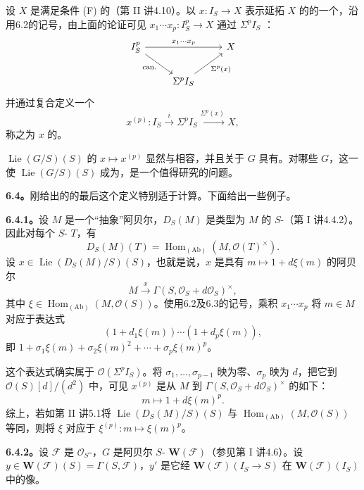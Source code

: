 设 $X$ 是满足条件 (F) 的（第 II 讲4.10）。以 $x:I_S\to X$ 表示延拓 $X$ 的的一个，沿用6.2的记号，由上面的论证可见 $x_1\cdots x_p:I_S^p\to X$ 通过 $\Sigma^pI_S$ ：
\[
\begin{tikzcd}
 I_S^p\arrow[rr,"x_1\cdots x_p"]\arrow[dr,"\mathrm{can.}"']&&X\\
 &\Sigma^pI_S\arrow[ur,"\Sigma^p(x)"']
\end{tikzcd}
\]
并通过复合定义一个
\[
 x^{(p)}:I_S\xrightarrow{i}\Sigma^pI_S\xrightarrow{\Sigma^p(x)}X,
\]
称之为 $x$ 的。

$\operatorname{Lie}(G/S)(S)$ 的 $x\mapsto x^{(p)}$ 显然与相容，并且关于 $G$ 具有。对哪些 $G$，这一使 $\operatorname{Lie}(G/S)(S)$ 成为，是一个值得研究的问题。

\textbf{6.4。}刚给出的的最后这个定义特别适于计算。下面给出一些例子。

\textbf{6.4.1。}设 $M$ 是一个“抽象”阿贝尔，$D_S(M)$ 是类型为 $M$ 的 $S$-（第 I 讲4.4.2）。因此对每个 $S$- $T$，有
\[
 D_S(M)(T)=\operatorname{Hom}_{(\mathrm{Ab})}(M,\mathcal O(T)^\times).
\]
设 $x\in\operatorname{Lie}(D_S(M)/S)(S)$，也就是说，$x$ 是具有 $m\mapsto1+d\xi(m)$ 的阿贝尔
\[
 M\xrightarrow{x}\Gamma(S,\mathcal O_S+d\mathcal O_S)^\times,
\]
其中 $\xi\in\operatorname{Hom}_{(\mathrm{Ab})}(M,\mathcal O(S))$。使用6.2及6.3的记号，乘积 $x_1\cdots x_p$ 将 $m\in M$ 对应于表达式
\[
 (1+d_1\xi(m))\cdots(1+d_p\xi(m)),
\]
即 $1+\sigma_1\xi(m)+\sigma_2\xi(m)^2+\cdots+\sigma_p\xi(m)^p$。

这个表达式确实属于 $\mathcal O(\Sigma^pI_S)$。将 $\sigma_1,\ldots,\sigma_{p-1}$ 映为零、$\sigma_p$ 映为 $d$，把它到 $\mathcal O(S)[d]/(d^2)$ 中，可见 $x^{(p)}$ 是从 $M$ 到 $\Gamma(S,\mathcal O_S+d\mathcal O_S)^\times$ 的如下：
\[
 m\longmapsto1+d\xi(m)^p.
\]
综上，若如第 II 讲5.1将 $\operatorname{Lie}(D_S(M)/S)(S)$ 与 $\operatorname{Hom}_{(\mathrm{Ab})}(M,\mathcal O(S))$ 等同，则将 $\xi$ 对应于 $\xi^{(p)}:m\mapsto\xi(m)^p$。

\textbf{6.4.2。}设 $\mathcal F$ 是 $\mathcal O_S$-，$G$ 是阿贝尔 $S$- $\mathbf W(\mathcal F)$（参见第 I 讲4.6）。设 $y\in\mathbf W(\mathcal F)(S)=\Gamma(S,\mathcal F)$，$y'$ 是它经 $\mathbf W(\mathcal F)(I_S\to S)$ 在 $\mathbf W(\mathcal F)(I_S)$ 中的像。

